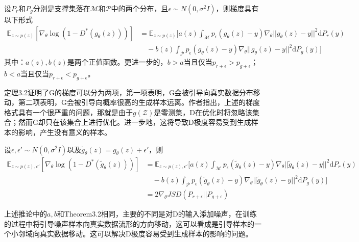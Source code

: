             \begin{theorem}[Theorem 3.2]
            设$P_r$和$P_g$分别是支撑集落在$\mathcal{M}$和$\mathcal{P}$中的两个分布，且$\epsilon \sim N(0,\sigma^2I)$，则梯度具有以下形式
            \begin{align*}
            \mathbb{E}_{z\sim p(z)}[\nabla_\theta \log (1-D^*(g_\theta(z)))] &= \mathbb{E}_{z\sim p(z)}\bigg[ a(z)\int_\mathcal{M}p_\epsilon(g_\theta(z)-y)\nabla_\theta||g_\theta(z)-y||^2\mathrm{d}P_r(y)\\
            &\quad -b(z)\int_\mathcal{P}p_\epsilon(g_\theta(z)-y)\nabla_\theta||g_\theta(z)-y||^2\mathrm{d}P_g(y)\bigg]
            \end{align*}
            其中：$a(z),b(z)$是两个正值函数。更进一步的，$b>a$当且仅当$p_{r+\epsilon} > p_{g+\epsilon}$；$b<a$当且仅当$p_{r+\epsilon} < p_{g+\epsilon}$。
            \end{theorem}
            \par
            定理3.2证明了G的梯度可以分为两项，第一项表明，G会被引导向真实数据分布移动，第二项表明，G会被引导向概率很高的生成样本远离。作者指出，上述的梯度格式具有一个很严重的问题，那就是由于$g(\mathcal{Z})$是零测集，D在优化时将忽略该集合；然而G却只在该集合上进行优化。进一步地，这将导致D极度容易受到生成样本的影响，产生没有意义的样本。
            \begin{corollary}[corollary 3.2]
            设$\epsilon,\epsilon'\sim N(0,\sigma^2I)$以及$\tilde{g}_{\theta}(z)=g_\theta(z)+\epsilon' $，则
            \begin{align*}
            \mathbb{E}_{z\sim p(z),\epsilon'}[\nabla_\theta\log (1-D^*(\tilde{g}_\theta(z)))]& = \mathbb{E}_{z\sim p(z),\epsilon'} \bigg[a(z)\int_\mathcal{M}p_\epsilon(\tilde{g}_\theta(z)-y)\nabla_\theta||\tilde{g}_\theta(z)-y||^2 \mathrm{d}P_r(y) \\
            &\quad -b(z)\int_\mathcal{P}p_\epsilon(\tilde{g}_\theta(z)-y)\nabla_\theta||\tilde{g}_\theta(z)-y||^2\mathrm{d}P_g(y)\bigg]\\
            &=2\nabla_\theta JSD(P_{r+\epsilon}||P_{g+\epsilon})
            \end{align*}
            \end{corollary}
            \par
            上述推论中的$a,b$和Theorem3.2相同，主要的不同是对D的输入添加噪声，在训练的过程中将引导噪声样本向真实数据流形的方向移动，这可以看成是引导样本的一个小邻域向真实数据移动。这可以解决D极度容易受到生成样本的影响的问题。
